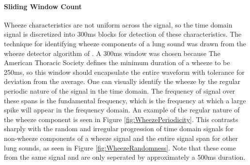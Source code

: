 \documentclass{article}
\begin{document}
\paragraph{Sliding Window Count}

Wheeze characteristics are not uniform across the signal, so the time domain signal is discretized into 300ms blocks for detection of these characteristics. The technique for identifying wheeze components of a lung sound was drawn from the wheeze detector algorithm of \cite{Yi MEng}. A 300ms window was chosen because The American Thoracic Society defines the minimum duration of a wheeze to be 250ms, so this window should encapsulate the entire waveform with tolerance for deviation from the average. One can visually identify the wheeze by the regular periodic nature of the signal in the time domain. The frequency of signal over these spans is the fundamental frequency, which is the frequency at which a large spike will appear in the frequency domain. An example of the regular nature of the wheeze component is seen in Figure \ref{fig:WheezePeriodicity}. This contrasts sharply with the random and irregular progression of time domain signals for non-wheeze components of a wheeze signal and the entire signal span for other lung sounds, as seen in Figure \ref{fig:WheezeRandomness}. Note that these come from the same signal and are only seperated by approximately a 500ms duration. \\
\end{document}
